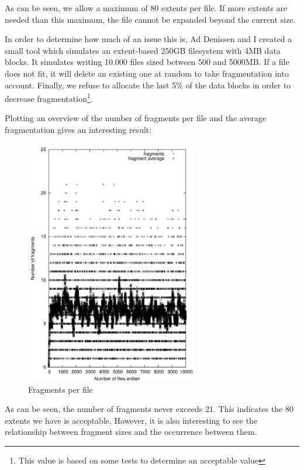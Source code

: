 \newpage


As can be seen, we allow a maximum of 80 extents per file. If more extents are needed than this maximum, the file cannot be expanded beyond the current size.

In order to determine how much of an issue this is, Ad Denissen and I created a small tool which simulates an extent-based 250GB filesystem with 4MB data blocks. It simulates writing 10.000 files sized between 500 and 5000MB. If a file does not fit, it will delete an existing one at random to take fragmentation into account. Finally, we refuse to allocate the last 5\% of the data blocks in order to decrease fragmentation\footnote{This value is based on some tests to determine an acceptable value}.

Plotting an overview of the number of fragments per file and the average fragmentation gives an interesting result:

\begin{center}
\begin{figure}[h]
\includegraphics[width=7.5cm]{frag-log}
\caption{Fragments per file}
\end{figure}
\end{center}

As can be seen, the number of fragments never exceeds 21. This indicates the 80 extents we have is acceptable. However, it is also interesting to see the relationship between fragment sizes and the occurrence between them. 

